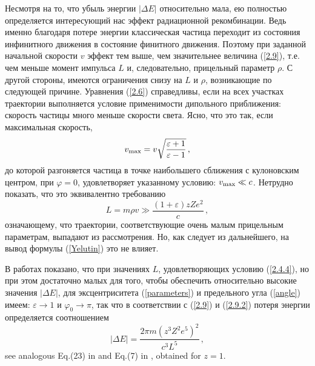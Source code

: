 \documentclass{SovJurn/JETPL}
\begin{document}
Несмотря на то, что убыль энергии $|\Delta E|$ относительно мала, ею полностью определяется интересующий нас эффект радиационной рекомбинации. Ведь именно благодаря потере энергии классическая частица переходит из состояния инфинитного движения в состояние финитного движения. Поэтому при заданной начальной скорости $v$ эффект тем выше, чем значительнее величина (\ref{2.9}), т.е. чем меньше момент импульса $L$ и, следовательно, прицельный параметр $\rho$. С другой стороны, имеются ограничения снизу на $L$ и $\rho$, возникающие по следующей причине. Уравнения (\ref{2.6}) справедливы, если на всех участках траектории выполняется условие применимости дипольного приближения: скорость частицы много меньше скорости света. Ясно, что это так, если максимальная скорость,
\begin{equation}
v_{\rm max}=v\sqrt{\frac{\varepsilon+1}{\varepsilon-1}}\,,
\label{vmax}
\end{equation}
до которой разгоняется частица в точке наибольшего сближения с кулоновским центром, при $\varphi=0$, удовлетворяет указанному условию: $v_{\rm max}\ll c$. Нетрудно показать, что это эквивалентно требованию
\begin{equation}
\label{2.4.4}
L=m\rho v\gg\frac{(1+\varepsilon)zZe^2}{c}\,,
\end{equation}
означающему, что траектории, соответствующие очень малым прицельным параметрам, выпадают из рассмотрения. Но, как следует из дальнейшего, на вывод формулы (\ref{Yelutin}) это не влияет.

В работах \cite{kramers1923xciii,elutin} показано, что при значениях $L$, удовлетворяющих условию (\ref{2.4.4}), но при этом достаточно малых для того, чтобы обеспечить относительно высокие значения $|\Delta E|$, для эксцентриситета (\ref{parameters}) и предельного угла (\ref{angle}) имеем: $\varepsilon\to 1$ и $\varphi_0\to \pi$, так что в соответствии с (\ref{2.9}) и (\ref{2.9.2}) потеря энергии определяется соотношением
\begin{equation}
\label{EnergyLossFromLL}
|\Delta E|=\frac{2\pi m(z^3Z^2e^5)^2}{c^3L^5}\,,
\end{equation}
see analogous Eq.(23) in \cite{kramers1923xciii} and Eq.(7) in \cite{elutin}, obtained for $z=1$.
\end{document}
